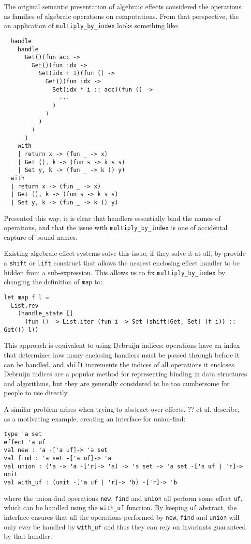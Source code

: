 \documentclass{article}
\newcommand{\code}[2][ocaml]{\lstinline[style={#1}]{#2}}
\begin{document}
The original semantic presentation of algebraic effects considered the
operations as families of algebraic operations on computations. From
that perspective, the an application of \code{multiply_by_index} looks
something like:
\begin{lstlisting}
  handle
    handle
      Get()(fun acc ->
        Get()(fun idx ->
          Set(idx + 1)(fun () ->
            Get()(fun idx ->
              Set(idx * i :: acc)(fun () ->
                ...
              )
            )
          )
        )
      )
    with
    | return x -> (fun _ -> x)
    | Get (), k -> (fun s -> k s s)
    | Set y, k -> (fun _ -> k () y)
  with
  | return x -> (fun _ -> x)
  | Get (), k -> (fun s -> k s s)
  | Set y, k -> (fun _ -> k () y)
\end{lstlisting}
Presented this way, it is clear that handlers essentially bind the names
of operations, and that the issue with \code{multiply_by_index} is one
of accidental capture of bound names.

Existing algebraic effect systems solve this issue, if they solve it at
all, by provide a \code{shift} or \code{lift} construct that allows the
nearest enclosing effect handler to be hidden from a
sub-expression. This allows us to fix \code{multiply_by_index} by
changing the definition of \code{map} to:
\begin{lstlisting}
let map f l =
  List.rev
    (handle_state []
      (fun () -> List.iter (fun i -> Set (shift[Get, Set] (f i)) :: Get()) l))
\end{lstlisting}
This approach is equivalent to using Debruijn indices: operations have
an index that determines how many enclosing handlers must be passed
through before it can be handled, and \code{shift} increments the
indices of all operations it encloses. Debruijn indices are a popular
method for representing binding in data structures and algorithms, but
they are generally considered to be too cumbersome for people to use
directly.

A similar problem arises when trying to abstract over effects. ?? et
al.\cite{??} describe, as a motivating example, creating an interface
for union-find:
\begin{lstlisting}
type 'a set
effect 'a uf
val new : 'a -['a uf]-> 'a set
val find : 'a set -['a uf]-> 'a
val union : ('a -> 'a -['r]-> 'a) -> 'a set -> 'a set -['a uf | 'r]-> unit
val with_uf : (unit -['a uf | 'r]-> 'b) -['r]-> 'b
\end{lstlisting}
where the union-find operations \code{new}, \code{find} and \code{union}
all perform some effect \code{uf}, which can be handled using the
\code{with_uf} function. By keeping \code{uf} abstract, the interface
ensures that all the operations performed by \code{new}, \code{find} and
\code{union} will only ever be handled by \code{with_uf} and thus they
can rely on invariants guaranteed by that handler.
\end{document}
